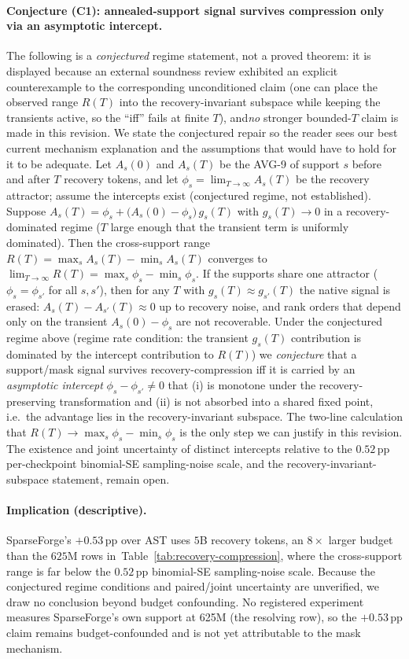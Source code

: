 \documentclass{article}
\begin{document}
\paragraph{Conjecture (C1): annealed-support signal survives compression only via an asymptotic intercept.}
\label{conj:survival}
The following is a \emph{conjectured} regime statement, not a proved theorem: it is displayed because an
external soundness review exhibited an explicit counterexample to the corresponding unconditioned claim
(one can place the observed range $R(T)$ into the recovery-invariant subspace while keeping the
transients active, so the ``iff'' fails at finite $T$), and\emph{no} stronger bounded-$T$ claim is made
in this revision. We state the conjectured repair so the reader sees our best current mechanism
explanation and the assumptions that would have to hold for it to be adequate.
Let $A_s(0)$ and $A_s(T)$ be the AVG-9 of support $s$ before and after
$T$ recovery tokens, and let $\phi_s = \lim_{T\to\infty} A_s(T)$ be the
recovery attractor; assume the intercepts exist (conjectured regime, not established).
Suppose
$A_s(T) = \phi_s + \bigl(A_s(0)-\phi_s\bigr)\,g_s(T)$ with $g_s(T)\to0$ in a recovery-dominated regime
($T$ large enough that the transient term is uniformly dominated).
Then the cross-support range
$R(T)=\max_s A_s(T)-\min_s A_s(T)$ converges to
$\lim_{T\to\infty}R(T)=\max_s\phi_s-\min_s\phi_s$.
If the supports share one attractor ($\phi_s=\phi_{s'}$ for all $s,s'$), then
for any $T$ with $g_s(T)\approx g_{s'}(T)$ the native signal is erased:
$A_s(T)-A_{s'}(T)\approx0$ up to recovery noise, and rank orders that depend
only on the transient $A_s(0)-\phi_s$ are not recoverable. Under the conjectured regime above
(regime rate condition: the transient $g_s(T)$ contribution is dominated by the intercept
contribution to $R(T)$) we \emph{conjecture}
that a support/mask signal survives recovery-compression iff
it is carried by an \emph{asymptotic intercept}
$\phi_s-\phi_{s'}\neq0$ that (i) is monotone under the recovery-preserving
transformation and (ii) is not absorbed into a shared fixed point, i.e.\ the
advantage lies in the recovery-invariant subspace. The two-line calculation that
$R(T)\to\max_s\phi_s-\min_s\phi_s$ is the only step we can justify in this revision.
The existence and joint uncertainty of distinct intercepts relative to the $0.52$\,pp
per-checkpoint binomial-SE sampling-noise scale, and the recovery-invariant-subspace
statement, remain open.

\paragraph{Implication (descriptive).}
SparseForge's $+0.53$\,pp over AST uses $5$B recovery tokens, an $8\times$ larger
budget than the $625$M rows in~Table~\ref{tab:recovery-compression}, where the
cross-support range is far below the $0.52$\,pp binomial-SE sampling-noise scale.
Because the conjectured regime conditions and paired/joint uncertainty are unverified,
we draw no conclusion beyond budget confounding. No registered
experiment measures SparseForge's own support at 625M (the resolving row), so
the $+0.53$\,pp claim remains budget-confounded and is not yet attributable
to the mask mechanism.
\end{document}
